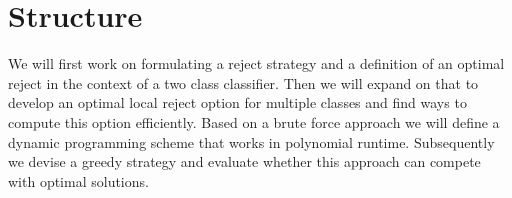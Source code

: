 \section{Structure}
We will first work on formulating a reject strategy and a definition of an optimal reject in the context of a two class classifier. Then we will expand on that to develop an optimal local reject option for multiple classes and find ways to compute this option efficiently. Based on a brute force approach we will define a dynamic programming scheme that works in polynomial runtime. Subsequently we devise a greedy strategy and evaluate whether this approach can compete with optimal solutions.